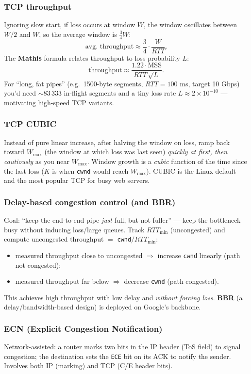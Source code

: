 \documentclass[hidelinks]{article}
\begin{document}
\subsubsection{TCP throughput}
Ignoring slow start, if loss occurs at window $W$, the window oscillates
between $W/2$ and $W$, so the average window is $\tfrac{3}{4}W$:
\[
    \text{avg.\ throughput} \approx \frac{3}{4}\cdot\frac{W}{RTT}.
\]
The \textbf{Mathis} formula relates throughput to loss probability $L$:
\[
    \text{throughput} \approx \frac{1.22 \cdot \text{MSS}}{RTT\,\sqrt{L}}.
\]
For ``long, fat pipes'' (e.g.\ 1500-byte segments, $RTT=100$ ms, target
10 Gbps) you'd need $\sim$83\,333 in-flight segments and a tiny loss rate
$L \approx 2\times 10^{-10}$ --- motivating high-speed TCP variants.

\subsubsection{TCP CUBIC}
Instead of pure linear increase, after halving the window on loss, ramp back
toward $W_{\max}$ (the window at which loss was last seen)
\emph{quickly at first, then cautiously} as you near $W_{\max}$. Window growth
is a \emph{cubic} function of the time since the last loss ($K$ is when
\texttt{cwnd} would reach $W_{\max}$). CUBIC is the Linux default and the most
popular TCP for busy web servers.

\subsubsection{Delay-based congestion control (and BBR)}
Goal: ``keep the end-to-end pipe \emph{just} full, but not fuller'' --- keep
the bottleneck busy without inducing loss/large queues. Track
$RTT_{\min}$ (uncongested) and compute uncongested throughput
$=$ \texttt{cwnd}$/RTT_{\min}$:
\begin{itemize}
    \item measured throughput close to uncongested $\Rightarrow$ increase
    \texttt{cwnd} linearly (path not congested);
    \item measured throughput far below $\Rightarrow$ decrease \texttt{cwnd}
    (path congested).
\end{itemize}
This achieves high throughput with low delay and \emph{without forcing loss}.
\textbf{BBR} (a delay/bandwidth-based design) is deployed on Google's
backbone.

\subsubsection{ECN (Explicit Congestion Notification)}
Network-assisted: a router marks two bits in the IP header (ToS field) to
signal congestion; the destination sets the \texttt{ECE} bit on its ACK to
notify the sender. Involves both IP (marking) and TCP (C/E header bits).
\end{document}

